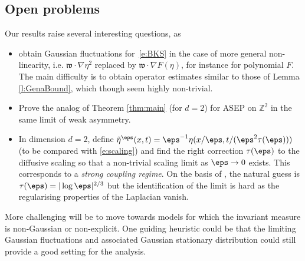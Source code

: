 \documentclass[reqno,11pt]{preprint}
\renewcommand{\Z}{\mathbb{Z}}
\newcommand{\fw}{\mathfrak{w}}
\newcommand{\1}{\mathds{1}}
\begin{document}
\subsection{Open problems}\label{sec:openproblems}

Our results raise several interesting questions, as
\begin{itemize}[noitemsep]
\item obtain Gaussian fluctuations for~\eqref{e:BKS} in the case of more general non-linearity, 
i.e. $\fw\cdot\nabla \eta^2$ replaced by $\fw\cdot\nabla F(\eta)$, for instance for polynomial $F$. 
The main difficulty is to obtain operator estimates similar to those of Lemma \ref{l:GenaBound}, 
which though seem highly non-trivial.
\item Prove the analog of Theorem \ref{thm:main} (for $d=2$) for ASEP on $\Z^2$ in the same limit of weak asymmetry.
\item In dimension $d=2$, define $\tilde\eta^\eps(x,t)=\eps^{-1}\eta( x/\eps, t/(\eps^2\tau(\eps)))$ 
(to be compared with \eqref{e:scaling}) and find the right correction $\tau(\eps)$ to the diffusive scaling 
so that a non-trivial scaling limit as $\eps\to0$ exists. This corresponds to a \emph{strong coupling regime}. 
On the basis of \cite{Yau}, the natural guess is $\tau(\eps)=|\log \eps|^{2/3}$ but the identification of the limit 
is hard as the regularising properties of the Laplacian vanish. 
\end{itemize}

More challenging will be to move towards models for which the invariant measure is non-Gaussian or non-explicit. 
One guiding heuristic could be that the limiting Gaussian fluctuations and 
associated Gaussian stationary distribution could still provide a good  setting for the analysis.
\end{document}
